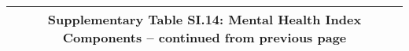 \begin{longtable}{llcccccccccc}
\multicolumn{12}{c}{{\bfseries Supplementary Table SI.14: Mental Health Index Components -- continued from previous page}} \\ \hline                                                                                                                                                                                                                                                                                                                                                                                                                                                                                                                                                                                                                                                                                                                                                      

\end{longtable}
